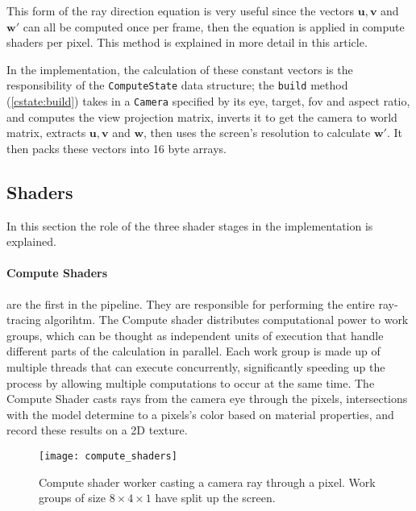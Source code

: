 This form of the ray direction equation is very useful since the vectors $\bm{u}, \bm{v}$ and $\bm{w'}$ can all be computed once per frame, then the equation is applied in compute shaders per pixel. This method is explained in more detail in this article\supercite{camera_rays}.


In the implementation, the calculation of these constant vectors is the responsibility of the \verb|ComputeState| data structure; the \verb|build| method (\cref{cstate:build}) takes in a \verb|Camera| specified by its eye, target, \acrshort{fov} and aspect ratio, and computes the view projection matrix, inverts it to get the camera to world matrix, extracts $\bm{u}, \bm{v}$ and $\bm{w}$, then uses the screen's resolution to calculate $\bm{w'}$. It then packs these vectors into 16 byte arrays.

\subsection{Shaders}
In this section the role of the three shader stages in the implementation is explained.

\begin{multicols}{2}
  \paragraph{Compute Shaders} are the first in the pipeline. They are responsible for performing the entire ray-tracing algorihtm. The Compute shader distributes computational power to work groups, which can be thought as independent units of execution that handle different parts of the calculation in parallel.
  Each work group is made up of multiple threads that can execute concurrently, significantly speeding up the process by allowing multiple computations to occur at the same time.
  The Compute Shader casts rays from the camera eye through the pixels, intersections with the model determine to a pixels's color based on material properties, and record these results on a 2D texture.

  \begin{figure}[H]
    \centering
    \texttt{[image: compute\_shaders]}
    \caption{Compute shader worker casting a camera ray through a pixel. Work groups of size $8\times4\times1$ have split up the screen.}
  \end{figure}
\end{multicols}
